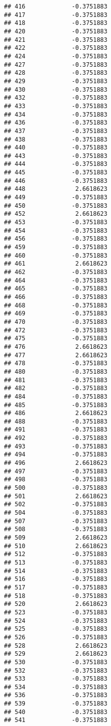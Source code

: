 \documentclass[
]{article}
\begin{document}
\begin{verbatim}
## 416             -0.3751883
## 417             -0.3751883
## 418             -0.3751883
## 420             -0.3751883
## 421             -0.3751883
## 422             -0.3751883
## 424             -0.3751883
## 427             -0.3751883
## 428             -0.3751883
## 429             -0.3751883
## 430             -0.3751883
## 432             -0.3751883
## 433             -0.3751883
## 434             -0.3751883
## 436             -0.3751883
## 437             -0.3751883
## 438             -0.3751883
## 440             -0.3751883
## 443             -0.3751883
## 444             -0.3751883
## 445             -0.3751883
## 446             -0.3751883
## 448              2.6618623
## 449             -0.3751883
## 450             -0.3751883
## 452              2.6618623
## 453             -0.3751883
## 454             -0.3751883
## 456             -0.3751883
## 459             -0.3751883
## 460             -0.3751883
## 461              2.6618623
## 462             -0.3751883
## 464             -0.3751883
## 465             -0.3751883
## 466             -0.3751883
## 468             -0.3751883
## 469             -0.3751883
## 470             -0.3751883
## 472             -0.3751883
## 475             -0.3751883
## 476              2.6618623
## 477              2.6618623
## 478             -0.3751883
## 480             -0.3751883
## 481             -0.3751883
## 482             -0.3751883
## 484             -0.3751883
## 485             -0.3751883
## 486              2.6618623
## 488             -0.3751883
## 491             -0.3751883
## 492             -0.3751883
## 493             -0.3751883
## 494             -0.3751883
## 496              2.6618623
## 497             -0.3751883
## 498             -0.3751883
## 500             -0.3751883
## 501              2.6618623
## 502             -0.3751883
## 504             -0.3751883
## 507             -0.3751883
## 508             -0.3751883
## 509              2.6618623
## 510              2.6618623
## 512             -0.3751883
## 513             -0.3751883
## 514             -0.3751883
## 516             -0.3751883
## 517             -0.3751883
## 518             -0.3751883
## 520              2.6618623
## 523             -0.3751883
## 524             -0.3751883
## 525             -0.3751883
## 526             -0.3751883
## 528              2.6618623
## 529              2.6618623
## 530             -0.3751883
## 532             -0.3751883
## 533             -0.3751883
## 534             -0.3751883
## 536             -0.3751883
## 539             -0.3751883
## 540             -0.3751883
## 541             -0.3751883

\end{verbatim}
\end{document}
